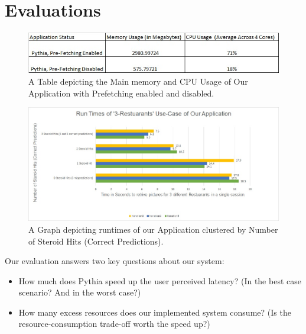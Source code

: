 \section{Evaluations}
\label{sec:eval}

\begin{figure}
  \includegraphics[width=\linewidth]{applicationResourceUsageTable1.jpg}
  \caption{A Table depicting the Main memory and CPU Usage of Our Application with Prefetching enabled and disabled.}
  \label{fig:table1}
\end{figure}

\begin{figure}
  \includegraphics[width=\linewidth]{runTimeChart1.jpg}
  \caption{A Graph depicting runtimes of our Application clustered by Number of Steroid Hits (Correct Predictions).}
  \label{fig:graph1}
\end{figure}


Our evaluation answers two key questions about our system:
\begin{itemize}
\item How much does Pythia speed up the user perceived latency? (In the best case scenario? And in the worst case?)
\item How many excess resources does our implemented system consume? (Is the resource-consumption trade-off worth the speed up?)
\end{itemize}

